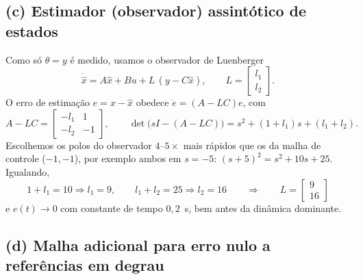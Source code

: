 \documentclass[11pt,a4paper]{article}
\begin{document}
\subsection*{(c) Estimador (observador) assint\'otico de estados}

Como s\'o $\theta=y$ \'e medido, usamos o observador de Luenberger
\[
\dot{\hat{x}}=A\hat{x}+Bu+L\,(y-C\hat{x}),\qquad L=\begin{bmatrix}l_1\\l_2\end{bmatrix}.
\]
O erro de estima\c{c}\~ao $e=x-\hat{x}$ obedece $\dot e=(A-LC)e$, com
\[
A-LC=\begin{bmatrix}-l_1&1\\-l_2&-1\end{bmatrix},
\qquad
\det\!\big(sI-(A-LC)\big)=s^2+(1+l_1)s+(l_1+l_2).
\]
Escolhemos os polos do observador $4$--$5\times$ mais r\'apidos que os da malha de
controle ($-1,-1$), por exemplo ambos em $s=-5$:
$(s+5)^2=s^2+10s+25$. Igualando,
\[
1+l_1=10\Rightarrow l_1=9,\qquad l_1+l_2=25\Rightarrow l_2=16
\qquad\Longrightarrow\qquad
\boxed{L=\begin{bmatrix}9\\16\end{bmatrix}}
\]
e $e(t)\to0$ com constante de tempo $0{,}2$~s, bem antes da din\^amica dominante.

\subsection*{(d) Malha adicional para erro nulo a refer\^encias em degrau}
\end{document}
